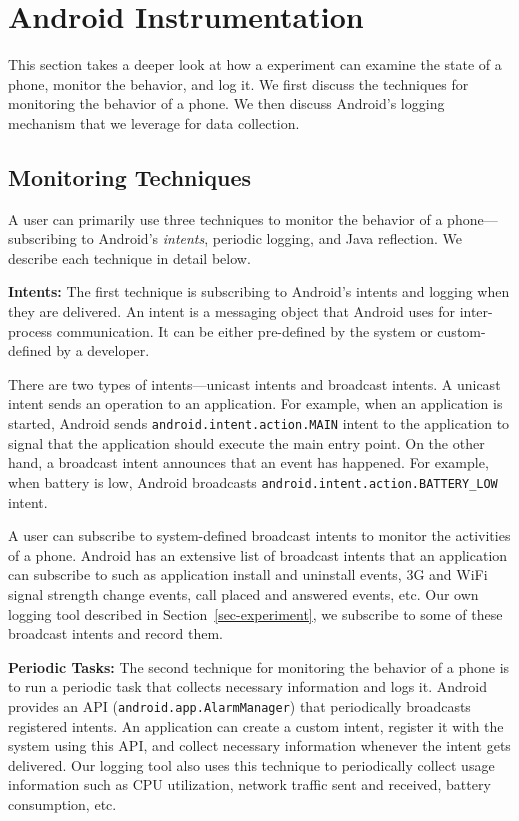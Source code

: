 \section{Android Instrumentation}
\label{sec-logging}

This section takes a deeper look at how a \PhoneLab{} experiment can examine the
state of a phone, monitor the behavior, and log it. We first discuss the
techniques for monitoring the behavior of a phone. We then discuss Android's
logging mechanism that we leverage for data collection.



\subsection{Monitoring Techniques}

A \PhoneLab{} user can primarily use three techniques to monitor the behavior of
a phone---subscribing to Android's {\it intents}, periodic logging, and Java
reflection. We describe each technique in detail below.

{\bf Intents:} The first technique is subscribing to Android's intents and
logging when they are delivered. An intent is a messaging object that Android
uses for inter-process communication. It can be either pre-defined by the system
or custom-defined by a developer.

There are two types of intents---unicast intents and broadcast intents. A
unicast intent sends an operation to an application. For example, when an
application is started, Android sends \texttt{android.intent.action.MAIN} intent
to the application to signal that the application should execute the main entry
point. On the other hand, a broadcast intent announces that an event has
happened. For example, when battery is low, Android broadcasts
\texttt{android.intent.action.BATTERY\_LOW} intent.

A \PhoneLab{} user can subscribe to system-defined broadcast intents to monitor
the activities of a phone. Android has an extensive list of broadcast intents
that an application can subscribe to such as application install and uninstall
events, 3G and WiFi signal strength change events, call placed and answered
events, etc. Our own logging tool described in Section~\ref{sec-experiment}, we
subscribe to some of these broadcast intents and record them.

{\bf Periodic Tasks:} The second technique for monitoring the behavior of a
phone is to run a periodic task that collects necessary information and logs it.
Android provides an API (\texttt{android.app.AlarmManager}) that periodically
broadcasts registered intents. An application can create a custom intent,
register it with the system using this API, and collect necessary information
whenever the intent gets delivered. Our logging tool also uses this technique to
periodically collect usage information such as CPU utilization, network traffic
sent and received, battery consumption, etc.

